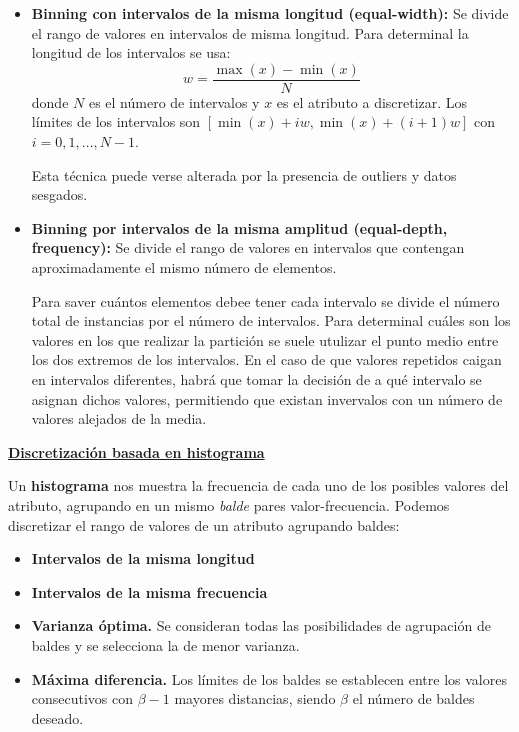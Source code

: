 \documentclass[12pt, letterpaper]{article}
\begin{document}
\begin{itemize}
    \item \textbf{Binning con intervalos de la misma longitud (equal-width):} Se divide el rango de valores en intervalos de misma longitud. Para determinal la longitud de los intervalos se usa:
    \[
        w = \frac{\max(x) - \min(x)}{N}
    \]
    donde $N$ es el número de intervalos y $x$ es el atributo a discretizar. Los límites de los intervalos son $[\min(x) + iw, \min(x) + (i+1)w]$ con $i = 0,1,\ldots,N-1$. 

    Esta técnica puede verse alterada por la presencia de outliers y datos sesgados.

    \item \textbf{Binning por intervalos de la misma amplitud (equal-depth, frequency):} Se divide el rango de valores en intervalos que contengan aproximadamente el mismo número de elementos. 
    
    Para saver cuántos elementos debee tener cada intervalo se divide el número total de instancias por el número de intervalos. Para determinal cuáles son los valores en los que realizar la partición se suele utulizar el punto medio entre los dos extremos de los intervalos. En el caso de que valores repetidos caigan en intervalos diferentes, habrá que tomar la decisión de a qué intervalo se asignan dichos valores, permitiendo que existan invervalos con un número de valores alejados de la media.
\end{itemize}

\vspace{1 em}
\underline{\textbf{Discretización basada en histograma}}

Un \textbf{histograma} nos muestra la frecuencia de cada uno de los posibles valores del atributo, agrupando en un mismo \textit{balde} pares valor-frecuencia. Podemos discretizar el rango de valores de un atributo agrupando baldes:
\begin{itemize}
    \item \textbf{Intervalos de la misma longitud}
    \item \textbf{Intervalos de la misma frecuencia}
    \item \textbf{Varianza óptima.} Se consideran todas las posibilidades de agrupación de baldes y se selecciona la de menor varianza.
    \item \textbf{Máxima diferencia.} Los límites de los baldes se establecen entre los valores consecutivos con $\beta - 1$ mayores distancias, siendo $\beta$ el número de baldes deseado.
\end{itemize}
\end{document}
